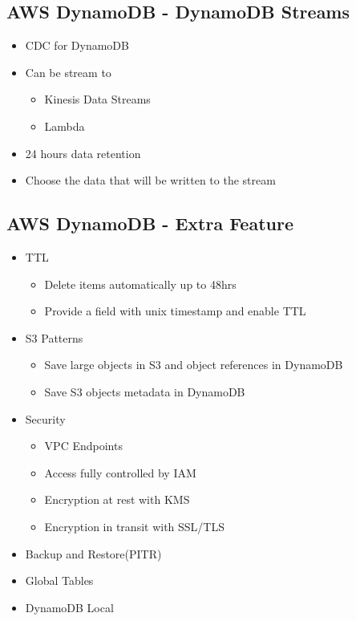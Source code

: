 \documentclass[../main.tex]{subfiles}
\begin{document}
\subsection{AWS DynamoDB - DynamoDB Streams}
\begin{itemize}
    \item CDC for DynamoDB
    \item Can be stream to
    \begin{itemize}
        \item Kinesis Data Streams
        \item Lambda
    \end{itemize}
    \item 24 hours data retention
    \item Choose the data that will be written to the stream
\end{itemize}

\subsection{AWS DynamoDB - Extra Feature}
\begin{itemize}
    \item TTL
    \begin{itemize}
        \item Delete items automatically up to 48hrs
        \item Provide a field with unix timestamp and enable TTL
    \end{itemize}
    \item S3 Patterns
    \begin{itemize}
        \item Save large objects in S3 and object references in DynamoDB
        \item Save S3 objects metadata in DynamoDB
    \end{itemize}
    \item Security
    \begin{itemize}
        \item VPC Endpoints
        \item Access fully controlled by IAM
        \item Encryption at rest with KMS
        \item Encryption in transit with SSL/TLS
    \end{itemize}
    \item Backup and Restore(PITR)
    \item Global Tables
    \item DynamoDB Local
\end{itemize}
\end{document}

